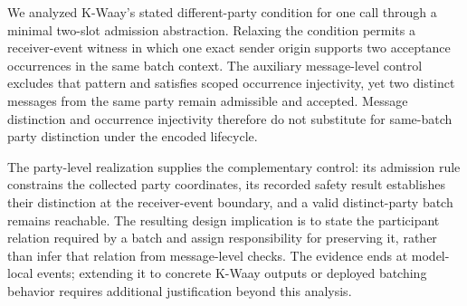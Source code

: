 We analyzed K-Waay's stated different-party condition for one \batchreceive
call through a minimal two-slot admission abstraction. Relaxing the condition
permits a receiver-event witness in which one exact sender origin supports
two acceptance occurrences in the same batch context. The auxiliary
message-level control excludes that pattern and satisfies scoped occurrence
injectivity, yet two distinct messages from the same party remain admissible
and accepted. Message distinction and occurrence injectivity therefore do not
substitute for same-batch party distinction under the encoded lifecycle.

The party-level realization supplies the complementary control: its admission
rule constrains the collected party coordinates, its recorded safety result
establishes their distinction at the receiver-event boundary, and a valid
distinct-party batch remains reachable. The resulting design implication is
to state the participant relation required by a batch and assign responsibility
for preserving it, rather than infer that relation from message-level checks.
The evidence ends at model-local \receiveraccept events; extending it to
concrete K-Waay outputs or deployed batching behavior requires additional
justification beyond this analysis.
